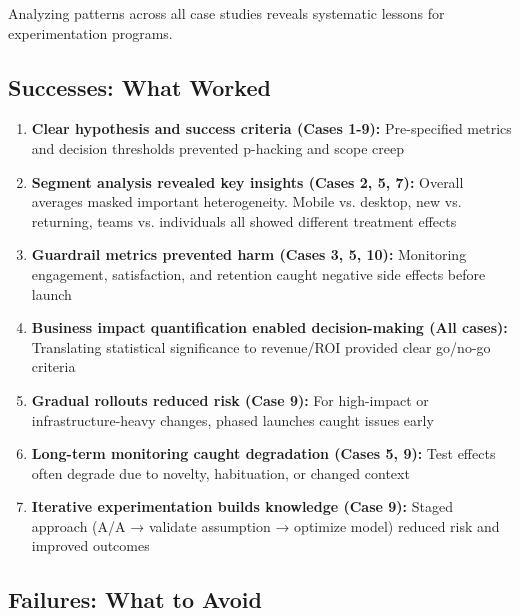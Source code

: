 Analyzing patterns across all case studies reveals systematic lessons for experimentation programs.

\subsection{Successes: What Worked}

\begin{enumerate}
    \item \textbf{Clear hypothesis and success criteria (Cases 1-9):} Pre-specified metrics and decision thresholds prevented p-hacking and scope creep

    \item \textbf{Segment analysis revealed key insights (Cases 2, 5, 7):} Overall averages masked important heterogeneity. Mobile vs. desktop, new vs. returning, teams vs. individuals all showed different treatment effects

    \item \textbf{Guardrail metrics prevented harm (Cases 3, 5, 10):} Monitoring engagement, satisfaction, and retention caught negative side effects before launch

    \item \textbf{Business impact quantification enabled decision-making (All cases):} Translating statistical significance to revenue/ROI provided clear go/no-go criteria

    \item \textbf{Gradual rollouts reduced risk (Case 9):} For high-impact or infrastructure-heavy changes, phased launches caught issues early

    \item \textbf{Long-term monitoring caught degradation (Cases 5, 9):} Test effects often degrade due to novelty, habituation, or changed context

    \item \textbf{Iterative experimentation builds knowledge (Case 9):} Staged approach (A/A → validate assumption → optimize model) reduced risk and improved outcomes
\end{enumerate}

\subsection{Failures: What to Avoid}

